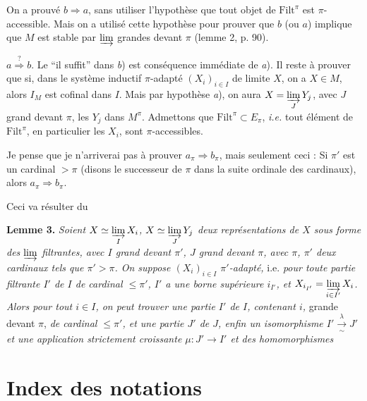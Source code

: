 On a prouvé $b\Longrightarrow a$, sans utiliser l'hypothèse que tout objet de $\mathrm{Filt}^\pi$ est $\pi$-accessible. Mais on a utilisé cette hypothèse pour prouver que $b$ (ou $a$) implique que $M$ est stable par $\varinjlim$ grandes devant $\pi$ (lemme 2, p. 90).

$a\overset{?}{\Longrightarrow} b$. Le ``il suffit'' dans \textit{b}) est conséquence immédiate de \textit{a}). Il reste à prouver que si, dans le système inductif $\pi$-adapté $(X_i)_{i\in I}$ de limite $X$, on a $X\in M$, alors $I_M$ est cofinal dans $I$. Mais par hypothèse \textit{a}), on aura $X = \varinjlim\limits_J Y_j$, avec $J$ grand devant $\pi$, les $Y_j$ dans $M^\pi$. Admettons que $\mathrm{Filt}^\pi\subset E_\pi$, \textit{i.e.} tout élément de $\mathrm{Filt}^\pi$, en particulier les $X_i$, sont $\pi$-accessibles.

Je pense que je n'arriverai pas à prouver $a_\pi\Longrightarrow b_\pi$, mais seulement ceci : Si $\pi'$ est un cardinal $>\pi$ (disons le successeur de $\pi$ dans la suite ordinale des cardinaux), alors $a_\pi\Longrightarrow b_\pi$.

Ceci va résulter du

\textbf{Lemme 3.} \textit{Soient $X\simeq\varinjlim\limits_I X_i$, $X\simeq\varinjlim\limits_J Y_j$ deux représentations de $X$ sous forme des $\varinjlim$ filtrantes, avec $I$ grand devant $\pi'$, $J$ grand devant $\pi$, avec $\pi$, $\pi'$ deux cardinaux tels que $\pi'>\pi$. On suppose $(X_i)_{i\in I}$ $\pi'$-adapté,} i.e. \textit{pour toute partie filtrante $I'$ de $I$ de cardinal $\le\pi'$, $I'$ a une borne supérieure $i_{I'}$, et $X_{i_{I'}} = \varinjlim\limits_{i\in I'} X_i$. Alors pour tout $i\in I$, on peut trouver une partie $I'$ de $I$, contenant $i$,} grande devant $\pi$, \textit{de cardinal $\le\pi'$, et une partie $J'$ de $J$, enfin un isomorphisme $I'\xrightarrow[\sim]{\lambda}J'$ et une application strictement croissante $\mu : J'\longrightarrow I'$ et des homomorphismes} 

\newpage
{}

\section*{Index des notations}

